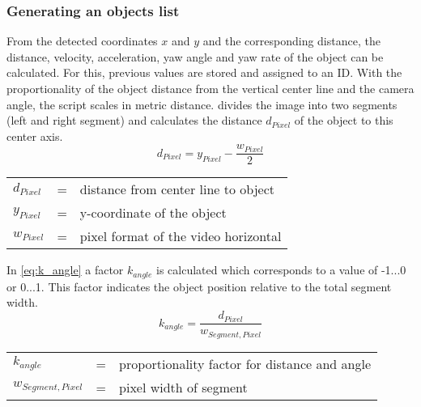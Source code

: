 \subsubsection{Generating an objects list}
From the detected coordinates $x$ and $y$ and the corresponding distance, the distance, velocity, acceleration, yaw angle and yaw rate of the object can be calculated. For this, previous values are stored and assigned to an \ac{ID}. With the proportionality of the object distance from the vertical center line and the camera angle, the script scales in metric distance.
 divides the image into two segments (left and right segment) and calculates the distance $d_{Pixel}$ of the object to this center axis.
\begin{equation}
		d_{Pixel} = y_{Pixel} - \frac{w_{Pixel}}{2}
		\label{eq:d_Pixel}
\end{equation}
\begin{table}[!h]
	\begin{center}
		\begin{tabular}{l c l}
			$d_{Pixel}$ & = & distance from center line to object\\
			$y_{Pixel}$ & = &  y-coordinate of the object\\
			$w_{Pixel}$ & = & pixel format of the video horizontal\\
		\end{tabular}
	\end{center}
\end{table}


In \cref{eq:k_angle} a factor $k_{angle}$ is calculated which corresponds to a value of -1...0 or 0...1. This factor indicates the object position relative to the total segment width.
\begin{equation}
k_{angle}  = \frac{d_{Pixel}}{w_{Segment,Pixel}}
\label{eq:k_angle}
\end{equation}
\begin{table}[!h]
	\begin{center}
		\begin{tabular}{l c l}
			$k_{angle}$ & = & proportionality factor for distance and angle\\
			$w_{Segment,Pixel}$ & = &  pixel width of segment\\
		\end{tabular}
	\end{center}
\end{table}


